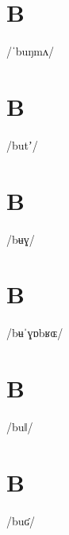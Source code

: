 \documentclass[10pt,a4paper,twoside]{book}
\begin{document}
\section*{B}

\begin{multicols}{3}
 {/ˈbuŋmʌ/} {}
\end{multicols}

\section*{B}

\begin{multicols}{3}
 {/butʼ/} {}
\end{multicols}

\section*{B}

\begin{multicols}{3}
 {/bʉɣ/} {}
\end{multicols}

\section*{B}

\begin{multicols}{3}
 {/bʉˈɣɒbʁɶ/} {}
\end{multicols}

\section*{B}

\begin{multicols}{3}
 {/buǁ/} {}
\end{multicols}

\section*{B}

\begin{multicols}{3}
 {/buʛ/} {}
\end{multicols}
\end{document}
